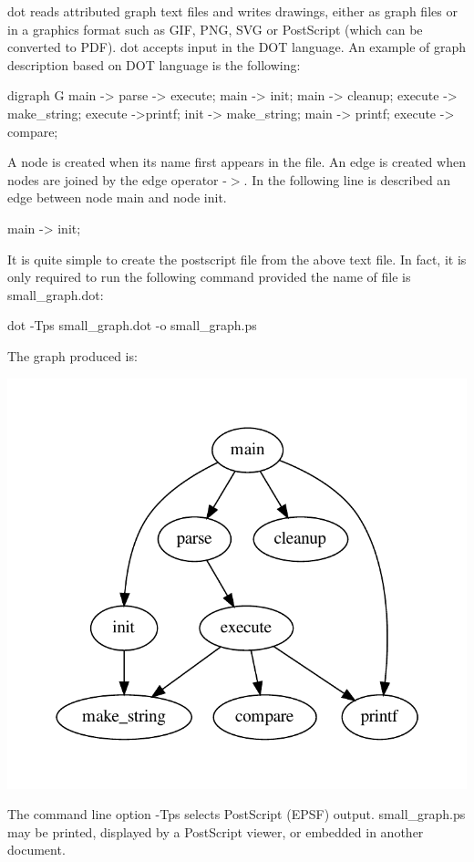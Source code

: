 {\ttfamily dot} reads attributed graph text files and writes drawings, either as graph files or in a graphics format such as G\+IF, P\+NG, S\+VG or Post\+Script (which can be converted to P\+DF). {\ttfamily dot} accepts input in the {\ttfamily D\+OT} language. An example of graph description based on {\ttfamily D\+OT} language is the following\+: \begin{DoxyVerb}digraph G {
    main -> parse -> execute;
    main -> init;
    main -> cleanup;
    execute -> make_string;
    execute ->printf;
    init -> make_string;
    main -> printf;
    execute -> compare;
}
\end{DoxyVerb}
 A node is created when its name first appears in the file. An edge is created when nodes are joined by the edge operator -\/$>$. In the following line is described an edge between node main and node init. \begin{DoxyVerb}    main -> init;
\end{DoxyVerb}
 It is quite simple to create the postscript file from the above text file. In fact, it is only required to run the following command provided the name of file is small\+\_\+graph.\+dot\+: \begin{DoxyVerb}dot -Tps small_graph.dot -o small_graph.ps
\end{DoxyVerb}
 The graph produced is\+: 
\begin{DoxyImageNoCaption}
  \mbox{\includegraphics[width=\textwidth,height=\textheight/2,keepaspectratio=true]{dot_inline_dotgraph_25}}
\end{DoxyImageNoCaption}
 The command line option {\ttfamily -\/\+Tps} selects Post\+Script (E\+P\+SF) output. {\ttfamily small\+\_\+graph.\+ps} may be printed, displayed by a Post\+Script viewer, or embedded in another document.


